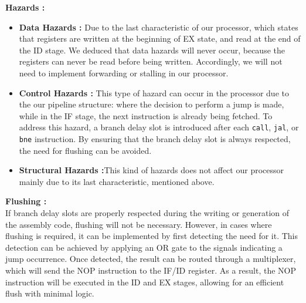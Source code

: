 \documentclass[a4paper,12pt]{article}
\begin{document}
\textbf{Hazards :}

\begin{itemize}
    \item \textbf{Data Hazards : }Due to the last characteristic of our processor, which states that registers are written at the beginning of EX state, and read at the end of the ID stage. We deduced that data hazards will never occur, because the registers can never be read before being written. Accordingly, we will not need to implement forwarding or stalling in our processor.
    \item \textbf{Control Hazards : }This type of hazard can occur in the processor due to the our pipeline structure: where the decision to perform a jump is made, while in the IF stage, the next instruction is already being fetched. To address this hazard, a branch delay slot is introduced after each \texttt{call}, \texttt{jal}, or \texttt{bne} instruction. By ensuring that the branch delay slot is always respected, the need for flushing can be avoided.
    \item \textbf{Structural Hazards :}This kind of hazards does not affect our processor mainly due to its last characteristic, mentioned above.
\end{itemize}

\textbf{Flushing :}\\

If branch delay slots are properly respected during the writing or generation of the assembly code, flushing will not be necessary. However, in cases where flushing is required, it can be implemented by first detecting the need for it. This detection can be achieved by applying an OR gate to the signals indicating a jump occurrence. Once detected, the result can be routed through a multiplexer, which will send the NOP instruction to the IF/ID register. As a result, the NOP instruction will be executed in the ID and EX stages, allowing for an efficient flush with minimal logic.
\end{document}
